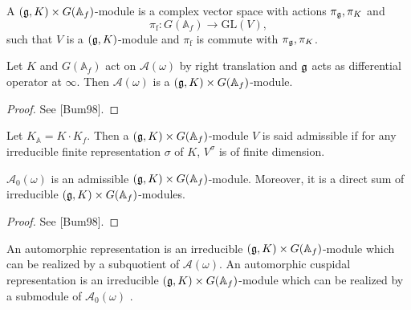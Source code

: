 \begin{definition}
A $(\mathfrak g,K)\times G(\mathbb A_f)$-module is a complex vector space with actions $\pi_{\mathfrak g}, \pi_{K}$ and
\[\pi_{\mathrm f}\colon G(\mathbb A_f)\to\mathrm{GL}(V),\]
such that $V$ is a  $(\mathfrak g,K)$-module and $\pi_\mathrm f$ is commute with $\pi_{\mathfrak g}, \pi_{K}$.
\end{definition}

\begin{lemma}
Let $K$ and $G(\mathbb A_f)$ act on  $\mathcal A(\omega)$ by right translation and $\mathfrak g$ acts as differential operator at $\infty$. Then $\mathcal A(\omega)$ is a $(\mathfrak g,K)\times G(\mathbb A_f)$-module.
\end{lemma}

\begin{proof}
See [Bum98].
\end{proof}

\begin{definition}
Let $K_{\mathbb A} =K\cdot K_f$. Then a $(\mathfrak g, K)\times G(\mathbb A_f)$-module $V$ is said admissible if for any irreducible finite representation $\sigma$ of $K$, $V^\sigma$ is of finite dimension. 
\end{definition}

\begin{lemma}\label{61}
$\mathcal A_0(\omega)$ is an admissible $(\mathfrak g,K)\times G(\mathbb A_f)$-module. Moreover, it is a direct sum of irreducible $(\mathfrak g,K)\times G(\mathbb A_f)$-modules.
\end{lemma}

\begin{proof}
See [Bum98].
\end{proof}

\begin{definition}
An automorphic representation is an irreducible $(\mathfrak g,K)\times G(\mathbb A_f)$-module which can be realized by a subquotient of $\mathcal A(\omega)$. An automorphic cuspidal representation is an irreducible $(\mathfrak g,K)\times G(\mathbb A_f)$-module which can be realized by a submodule of $\mathcal A_0(\omega)$ .
\end{definition}
